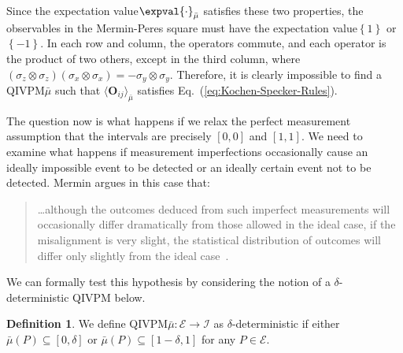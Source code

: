 \documentclass[english,reprint, aps, prl,superscriptaddress, showpacs,
showkeys, longbibliography, amsmath, amssymb]{revtex4-1}
\theoremstyle{plain}
\theoremstyle{definition}
\newtheorem{definition}[thm]{Definition}
\newcommand{\events}{\ensuremath{\mathcal{E}}}
\newcommand{\nb}{\nolinebreak[1] }
\begin{document}
Since the expectation value\nb$\expval{\cdot}_{\bar{\mu}}$ satisfies
these two properties, the observables in the Mermin-Peres square must
have the expectation value\nb$\left\{ 1\right\} $ or
$\left\{ -1\right\} $.  In each row and column, the operators commute,
and each operator is the product of two others, except in the
third column, where
$\left(\sigma_{z}\otimes\sigma_{z}\right)\left(\sigma_{x}\otimes\sigma_{x}\right)=-\sigma_{y}\otimes\sigma_{y}$.
Therefore, it is clearly impossible to find a QIVPM\nb$\bar{\mu}$ such
that $\langle \mathbf{O}_{ij}\rangle_{\bar \mu}$
satisfies Eq.~(\ref{eq:Kochen-Specker-Rules}).

The question now is what happens if we relax the perfect measurement
assumption that the intervals are precisely $[0,0]$ and
$[1,1]$. We need to examine what happens if
measurement imperfections occasionally cause an
ideally impossible event to be detected or an ideally certain event
not to be detected. Mermin argues in this case that:
\begin{quote}
  \ldots although the outcomes deduced from such imperfect
  measurements will occasionally differ dramatically from those
  allowed in the ideal case, if the misalignment is very slight, the
  statistical distribution of outcomes will differ only slightly from
  the ideal case~\citep{Mermin1999}.
\end{quote}

We can formally test this hypothesis by considering the notion of
a $\delta$-deterministic QIVPM below. 

\begin{definition}\label{def:delta-deterministic}We define
  QIVPM\nb$\bar{\mu}:\events\rightarrow\mathscr{I}$
  as $\delta$-deterministic if either
  $\bar{\mu}\left(P\right)\subseteq\left[0,\delta\right]$ or
  $\bar{\mu}\left(P\right)\subseteq\left[1-\delta,1\right]$ for any
  $P\in\events$.\end{definition}
\end{document}
